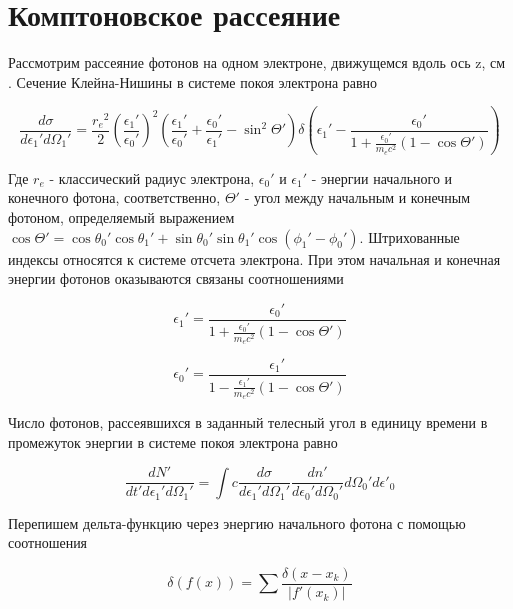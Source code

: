 \section{Комптоновское рассеяние}\label{ComptonFormulae}
Рассмотрим рассеяние фотонов на одном электроне, движущемся вдоль ось z, см \cite{Dubus}. Сечение Клейна-Нишины в системе покоя электрона равно

\begin{equation}\label{KleinNishina}
\frac{d\sigma}{d\epsilon_1'd\Omega_1'}=\frac{{r_e}^2}{2}\left(\frac{\epsilon_1'}{\epsilon_0'}\right)^2\left(\frac{\epsilon_1'}{\epsilon_0'}+\frac{\epsilon_0'}{\epsilon_1'}-\sin^2\Theta'\right) \delta\left(\epsilon_1' - \frac{\epsilon_0'}{1+\frac{\epsilon_0'}{m_e c^2}(1 - \cos \Theta')}\right)
\end{equation}

Где $r_e$ - классический радиус электрона, $\epsilon_0'$ и $\epsilon_1'$ - энергии начального и конечного фотона, соответственно, $\Theta'$ - угол между начальным и конечным фотоном, определяемый выражением $\cos\Theta' =\cos \theta_0' \cos \theta_1' + \sin \theta_0' \sin \theta_1' \cos(\phi_1' - \phi_0')$. Штрихованные индексы относятся к системе отсчета электрона. При этом начальная и конечная энергии фотонов оказываются связаны соотношениями

\begin{equation}
	\epsilon_1'=\frac{\epsilon_0'}{1+\frac{\epsilon_0'}{m_e c^2}(1 - \cos \Theta')}	
\end{equation}

\begin{equation}
	\epsilon_0'=\frac{\epsilon_1'}{1-\frac{\epsilon_1'}{m_e c^2}(1 - \cos \Theta')}
\end{equation}

Число фотонов, рассеявшихся в заданный телесный угол в единицу времени в промежуток энергии в системе покоя электрона равно

\begin{equation}
\frac{dN'}{dt'd\epsilon_1'd\Omega_1'}=\int c \frac{d\sigma}{d\epsilon_1'd\Omega_1'} \frac{dn'}{d\epsilon_0'd\Omega_0'}d\Omega_0'd\epsilon'_0
\end{equation}

Перепишем дельта-функцию через энергию начального фотона с помощью соотношения 

\begin{equation}
	\delta(f(x)) = \sum \frac{\delta(x-x_k)}{|f'(x_k)|}
\end{equation}

